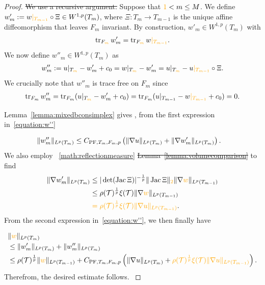 \documentclass[10pt,letterpaper]{article}
\newcommand\cye[1]{%
  \protect\leavevmode
  \begingroup
    \color{red!35!yellow}%
    #1%
  \endgroup
}
\begin{document}
\begin{proof}
    \cye{\sout{We use a recursive argument.}} Suppose that $\cye{1} < m \leq M$.
    We define $w'_{m} := w\cye{|_{T_{m-1}}} \circ \Xi \in W^{1,p}(T_{m})$,
    where $\Xi : T_{m} \rightarrow T_{m-1}$ is the unique affine diffeomorphism that leaves $F_{m}$ invariant. 
    By construction, $w'_{m} \in W^{1,p}(T_{m})$ with 
    \begin{align*}
        \trace_{F_{\cye{m}}} w'_{m} = \trace_{F_{\cye{m}}} w\cye{|_{T_{m-1}}}
        .
    \end{align*}
    We now define $w''_{m} \in W^{1,p}(T_{m})$ as
\cye{    \begin{align}\label{equation:w''}
        w''_{m} := u|_{T_{\cye{m}}} - w'_{m} + c_0 = w|_{T_{\cye{m}}} - w'_{m} = u|_{T_{\cye{m}}} - u\cye{|_{T_{m-1}}} \circ \Xi.
    \end{align}
    We crucially note that $w''_{m}$ is trace free on $F_{m}$ since
    \begin{align*}
        \trace_{F_{m}} w''_{m} = \trace_{F_{m}} (u|_{T_{\cye{m}}} - w'_{m} + c_0) = \trace_{F_{m}} (u|_{T_{m-1}} - w\cye{|_{T_{m-1}}} + c_0) = 0.
    \end{align*}}
    Lemma~\ref{lemma:mixedbconsimplex} gives\cye{, from the first expression in~\eqref{equation:w''}}
    \begin{align*}
        \| w''_{m} \|_{L^{p}(T_{m})} 
        &
        \leq 
        C_{{\rm PF},T_{m},F_{m},p} 
        \left( 
            \| \nabla u \|_{L^{p}(T_{m})} 
            + 
            \| \nabla w'_{m} \|_{L^{p}(T_{m})} 
        \right) 
        .
    \end{align*}
    We also employ\cye{~\eqref{math:reflectionmeasure} \sout{Lemma~\ref{lemma:volumecomparison}}} to find 
    \begin{align*}
        \| \nabla w'_{m} \|_{L^{p}(T_{m})}
        &
        \leq 
        |\det(\Jacobian \Xi  )|^{-\frac 1 p} 
        \| \Jacobian \Xi   \|_{\cye{2}}
        \| \nabla \cye{w} \|_{L^{p}(T_{m-1})}
        \\&
        \leq 
        \rho(\calT)^{\frac 1 p} \xi(\calT)
        \| \nabla \cye{w} \|_{L^{p}(T_{m-1})}
        \\&
        \cye{=
        \rho(\calT)^{\frac 1 p} \xi(\calT)
        \| \nabla u \|_{L^{p}(T_{m-1})} }
        .
    \end{align*}
    \cye{From the second expression in~\eqref{equation:w''}, we then finally have} 
    \begin{align*}
        &
        \| \cye{w} \|_{L^{p}(T_{m})}
        \\&
        \leq  
        \| w'_{m} \|_{L^{p}(T_{m})}
        + 
        \| w''_{m} \|_{L^{p}(T_{m})}
        \\&
        \leq  
        \rho(\calT)^{\frac 1 p} 
        \| \cye{w} \|_{L^{p}(T_{m-1})} 
        + 
        C_{\PF,T_{m},F_{m},p} 
        \left( 
            \| \nabla u \|_{L^{p}(T_{m})} 
            + 
            \cye{\rho(\calT)^{\frac 1 p} \xi(\calT)
        \| \nabla u \|_{L^{p}(T_{m-1})}}
        \right). 
    \end{align*}
\cye{Therefrom, the desired estimate follows.}
\end{proof}
\end{document}
